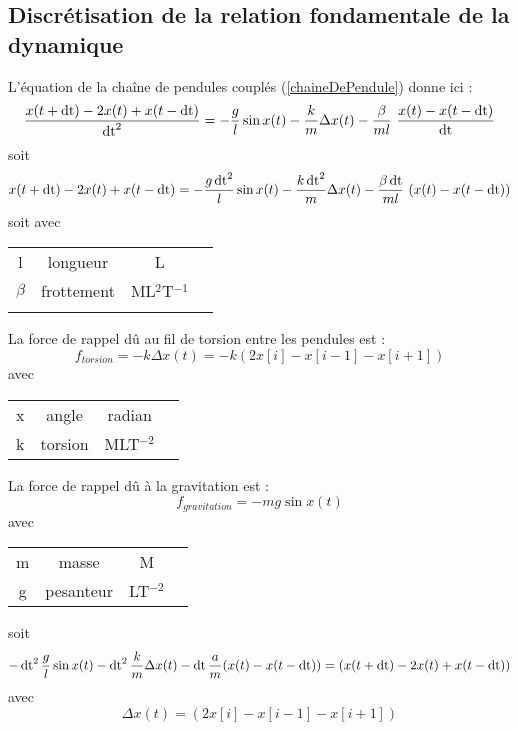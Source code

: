 \subsection{Discrétisation de la relation fondamentale de la dynamique}
%
L'équation de la chaîne de pendules couplés (\ref{chaineDePendule}) donne ici :
%
\[
\frac{x(t+\operatorname{dt}) - 2x(t) + x(t-\operatorname{dt})}{\operatorname{dt}^2} = - \frac{g}{l} \sin{x(t)}  -  \frac{k}{m} \Delta x(t)  -  \frac{\beta}{ml}\ \frac{x(t) - x(t-\operatorname{dt})}{\operatorname{dt}}
\]
soit
\[
x(t+\operatorname{dt}) - 2x(t) + x(t-\operatorname{dt}) = - \frac{g\operatorname{dt}^2}{l} \sin{x(t)}  -  \frac{k\operatorname{dt}^2}{m} \Delta x(t)  -  \frac{\beta \operatorname{dt}}{ml}\ (x(t) - x(t-\operatorname{dt}))
\]
soit
avec 
\begin{center}
\begin{tabular}{cccc}
l & longueur & L &  \\
$\beta$ & frottement & ML$^{2}$T$^{-1}$ &  \\
 &  &  &  \\
\end{tabular}
\end{center}
%
La force de rappel dû au fil de torsion entre les pendules est :
%
\[
f_{torsion} = -  k \Delta x(t) = -  k (2x[i]-x[i-1]-x[i+1])
\]
%
avec 
\begin{center}
\begin{tabular}{cccc}
x & angle & radian &  \\
k & torsion & MLT$^{-2}$ &  \\
\end{tabular}
\end{center}
%
La force de rappel dû à la gravitation est :
%
\[
f_{gravitation} = - m g \sin{x(t)}
\]
%
avec 
\begin{center}
\begin{tabular}{cccc}
m & masse & M &  \\
g & pesanteur & LT$^{-2}$ &  \\
\end{tabular}
\end{center}
%
soit
\[
- \operatorname{dt}^2\frac{g}{l}\sin{x(t)}-\operatorname{dt}^2\frac{k}{m} \Delta x(t) - \operatorname{dt}\frac{a}{m}(x(t)-x(t-\operatorname{dt}))=(x(t+\operatorname{dt})-2x(t)+x(t-\operatorname{dt}))
\]
avec
\[
\Delta x(t) = (2x[i]-x[i-1]-x[i+1])
\]
